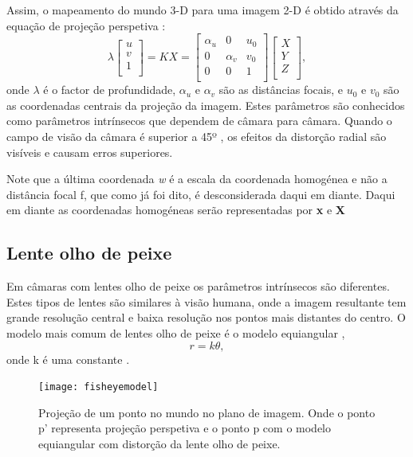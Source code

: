 Assim, o mapeamento do mundo 3-D para uma imagem 2-D é obtido através da equação de projeção perspetiva :
\[  \textbf{$\lambda$} \left[ \begin{array}{c} u\\v\\1\\ \end{array} \right] = 
KX = \left[ \begin{array}{ccc} \alpha_u  & 0 & \textit{u}_0 \\ 
0 & \alpha_v & \textit{v}_0 \\ 
0 & 0 & 1 \\
\end{array} \right] \left[ \begin{array}{c} X \\ 
Y \\ 
Z \\ 
\end{array} \right] , \]
onde $\lambda$ é o factor de profundidade, $\alpha_u$ e $\alpha_v$ são as distâncias focais, e $\textit{u}_0$ e $\textit{v}_0$ são as coordenadas centrais da projeção da imagem. Estes parâmetros são conhecidos como parâmetros intrínsecos que dependem de câmara para câmara. Quando o campo de visão da câmara é superior a 45º , os efeitos da distorção radial são visíveis e causam erros superiores.

Note que a última coordenada \textit{w} é a escala da coordenada homogénea e não a distância focal f, que como já foi dito, é desconsiderada daqui em diante. Daqui em diante as coordenadas homogéneas serão representadas por \textbf{x} e \textbf{X} 


\subsection{Lente olho de peixe}

Em câmaras com lentes olho de peixe os parâmetros intrínsecos são diferentes. Estes tipos de lentes são similares à visão humana, onde a imagem resultante tem grande resolução central e baixa resolução nos pontos mais distantes do centro. O modelo mais comum de lentes olho de peixe é o modelo equiangular ,  \[ r = k \theta ,  \] onde k é uma constante \cite{Hansen2009}.

\begin{figure}[h!] %
	\begin{center}
		\leavevmode		
		\texttt{[image: fisheyemodel]}
		\caption{Projeção de um ponto no mundo no plano de imagem. Onde o ponto p' representa projeção perspetiva e o ponto p com o modelo equiangular com distorção da lente olho de peixe. \cite{Srestasathiern2014,Kannala2004}}
		\label{fig:fishvspinhole} 
	\end{center}
\end{figure}

